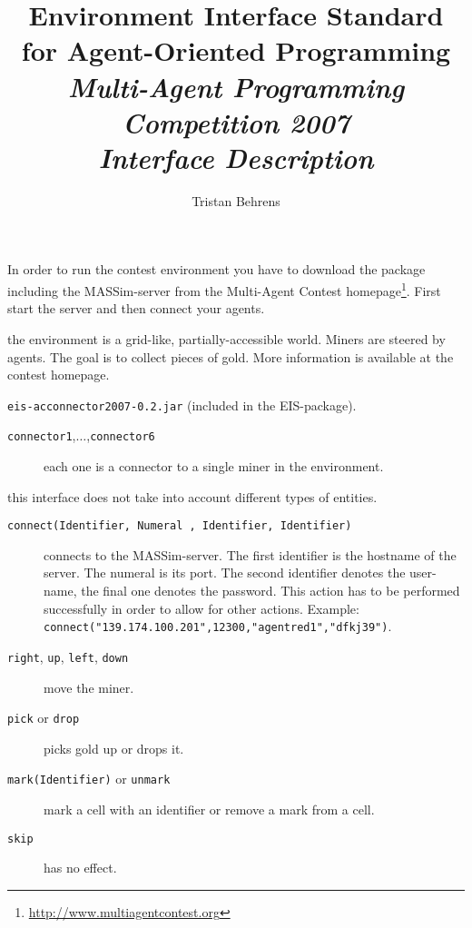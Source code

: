 \documentclass[a4]{article}
\newcommand{\EIS}{\textsf{EIS}\xspace}
\begin{document}
\title{Environment Interface Standard for Agent-Oriented Programming \\
\textit{Multi-Agent Programming Competition 2007\\ Interface Description}
}

\author{Tristan Behrens}

\maketitle

In order to run the contest environment you have to download the package including the MASSim-server from
the Multi-Agent Contest homepage\footnote{\url{http://www.multiagentcontest.org}}. 
First start the server and then connect your agents.

\medskip{} the environment is a grid-like, partially-accessible world. Miners are steered
by agents. The goal is to collect pieces of gold. More information is available at the 
contest homepage.

\medskip{} \texttt{eis-acconnector2007-0.2.jar} (included in the \EIS-package).

\medskip{}
\begin{description}
\item[\texttt{connector1},$\ldots$,\texttt{connector6}] each one is a connector to a single miner in the environment.
\end{description}

 this interface does not take into account different types of entities.

\medskip{}
\begin{description}
\item[\texttt{connect(Identifier, Numeral , Identifier, Identifier)}] connects to the MASSim-server.
The first identifier is the hostname of the server. The numeral is its port. The second identifier denotes the user-name,
the final one denotes the password. This action has to be performed successfully in order to allow for other actions.
Example: \texttt{connect("139.174.100.201",12300,"agentred1","dfkj39")}.
\item[\texttt{right}, \texttt{up}, \texttt{left}, \texttt{down}] move the miner. 
\item[\texttt{pick} or \texttt{drop}] picks gold up or drops it.
\item[\texttt{mark(Identifier)} or \texttt{unmark}] mark a cell with an identifier or
remove a mark from a cell.
\item[\texttt{skip}] has no effect.
\end{description}
\end{document}
